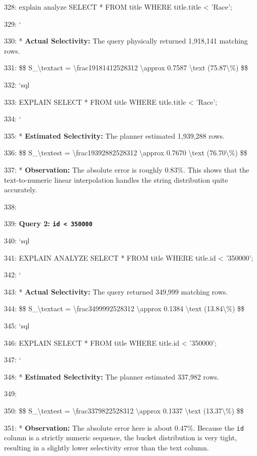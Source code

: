 \documentclass[11pt,a4paper]{article}
\begin{document}
{328: explain analyze SELECT * FROM title WHERE title.title < 'Race';

329: \texttt{}`

330: *   \textbf{Actual Selectivity:} The query physically returned 1,918,141 matching rows.

331:     \$\$ S\_{\textbackslash{}text{act}} = \textbackslash{}frac{1918141}{2528312} \textbackslash{}approx 0.7587 \textbackslash{}text{ (75.87\textbackslash{}\%)} \$\$

332:    \texttt{}`sql

333:    EXPLAIN SELECT * FROM title WHERE title.title < 'Race';

334: \texttt{}`

335: *   \textbf{Estimated Selectivity:} The planner estimated 1,939,288 rows.

336:     \$\$ S\_{\textbackslash{}text{est}} = \textbackslash{}frac{1939288}{2528312} \textbackslash{}approx 0.7670 \textbackslash{}text{ (76.70\textbackslash{}\%)} \$\$

337: *   \textbf{Observation:} The absolute error is roughly 0.83\%. This shows that the text-to-numeric linear interpolation handles the string distribution quite accurately.

338:

339: \textbf{Query 2: \texttt{id < 350000}}

340: \texttt{}`sql

341: EXPLAIN ANALYZE SELECT * FROM title WHERE title.id < '350000';

342: \texttt{}`

343: *   \textbf{Actual Selectivity:} The query returned 349,999 matching rows.

344:     \$\$ S\_{\textbackslash{}text{act}} = \textbackslash{}frac{349999}{2528312} \textbackslash{}approx 0.1384 \textbackslash{}text{ (13.84\textbackslash{}\%)} \$\$

345:    \texttt{}`sql

346: EXPLAIN SELECT * FROM title WHERE title.id < '350000';

347: \texttt{}`

348: *   \textbf{Estimated Selectivity:} The planner estimated 337,982 rows.

349:

350:     \$\$ S\_{\textbackslash{}text{est}} = \textbackslash{}frac{337982}{2528312} \textbackslash{}approx 0.1337 \textbackslash{}text{ (13.37\textbackslash{}\%)} \$\$

351: *   \textbf{Observation:} The absolute error here is about 0.47\%. Because the \texttt{id} column is a strictly numeric sequence, the bucket distribution is very tight, resulting in a slightly lower selectivity error than the text column.

}
\end{document}
